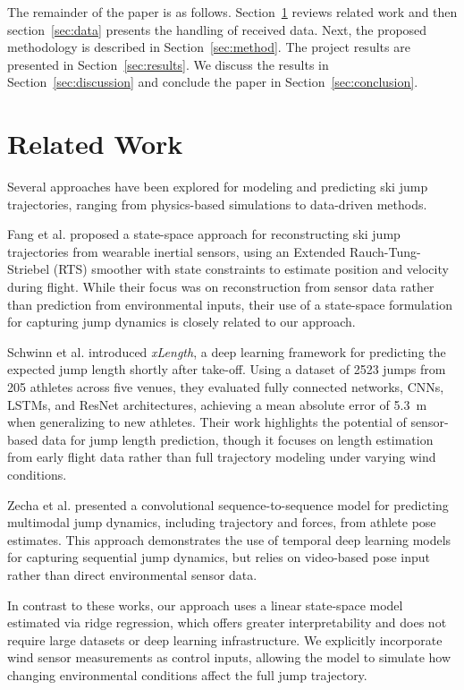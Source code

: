 \documentclass[sigconf,natbib=false, language=english]{acmart}
\begin{document}
The remainder of the paper is as follows. Section~\ref{sec:related} reviews
related work and then section~\ref{sec:data} presents the handling of received data. Next, the proposed methodology is described in Section~\ref{sec:method}. 
The project results are presented in Section~\ref{sec:results}. We discuss the results in Section~\ref{sec:discussion} and conclude the paper in Section~\ref{sec:conclusion}.

\section{Related Work}\label{sec:related}

Several approaches have been explored for modeling and predicting ski jump
trajectories, ranging from physics-based simulations to data-driven methods.

Fang et al. \cite{fang2020trajectory} proposed a state-space approach for
reconstructing ski jump trajectories from wearable inertial sensors, using an
Extended Rauch-Tung-Striebel (RTS) smoother with state constraints to estimate
position and velocity during flight. While their focus was on reconstruction
from sensor data rather than prediction from environmental inputs, their use of
a state-space formulation for capturing jump dynamics is closely related to our
approach.

Schwinn et al. \cite{schwinn2022xlength} introduced \textit{xLength}, a
deep learning framework for predicting the expected jump length shortly after
take-off. Using a dataset of 2523 jumps from 205 athletes across five venues,
they evaluated fully connected networks, CNNs, LSTMs, and ResNet architectures,
achieving a mean absolute error of 5.3~m when generalizing to new athletes.
Their work highlights the potential of sensor-based data for jump length
prediction, though it focuses on length estimation from early flight data rather
than full trajectory modeling under varying wind conditions.

Zecha et al. \cite{zecha2018convolutional} presented a convolutional
sequence-to-sequence model for predicting multimodal jump dynamics, including
trajectory and forces, from athlete pose estimates. This approach demonstrates
the use of temporal deep learning models for capturing sequential jump dynamics,
but relies on video-based pose input rather than direct environmental sensor
data.

In contrast to these works, our approach uses a linear state-space model
estimated via ridge regression, which offers greater interpretability and does
not require large datasets or deep learning infrastructure. We explicitly
incorporate wind sensor measurements as control inputs, allowing the model to
simulate how changing environmental conditions affect the full jump trajectory.
\end{document}
